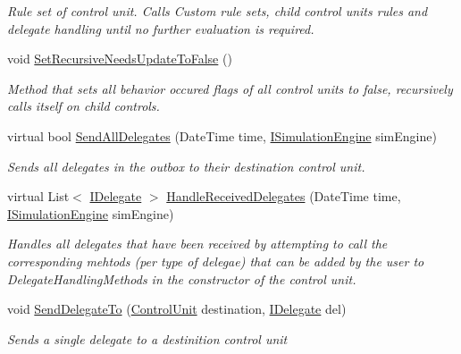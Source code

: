 \begin{DoxyCompactItemize}
\begin{DoxyCompactList}\small\item\em Rule set of control unit. Calls Custom rule sets, child control units rules and delegate handling until no further evaluation is required. \end{DoxyCompactList}\item 
void \hyperlink{class_simulation_core_1_1_h_c_c_m_elements_1_1_control_unit_a9269bc0295d7726e44ccd0d308cac776}{Set\+Recursive\+Needs\+Update\+To\+False} ()
\begin{DoxyCompactList}\small\item\em Method that sets all behavior occured flags of all control units to false, recursively calls itself on child controls. \end{DoxyCompactList}\item 
virtual bool \hyperlink{class_simulation_core_1_1_h_c_c_m_elements_1_1_control_unit_a6209d32c9661de07aab1848083533687}{Send\+All\+Delegates} (Date\+Time time, \hyperlink{interface_simulation_core_1_1_simulation_classes_1_1_i_simulation_engine}{I\+Simulation\+Engine} sim\+Engine)
\begin{DoxyCompactList}\small\item\em Sends all delegates in the outbox to their destination control unit. \end{DoxyCompactList}\item 
virtual List$<$ \hyperlink{interface_simulation_core_1_1_h_c_c_m_elements_1_1_i_delegate}{I\+Delegate} $>$ \hyperlink{class_simulation_core_1_1_h_c_c_m_elements_1_1_control_unit_a4f85fe01ec7bc2c8c435b702758ec240}{Handle\+Received\+Delegates} (Date\+Time time, \hyperlink{interface_simulation_core_1_1_simulation_classes_1_1_i_simulation_engine}{I\+Simulation\+Engine} sim\+Engine)
\begin{DoxyCompactList}\small\item\em Handles all delegates that have been received by attempting to call the corresponding mehtods (per type of delegae) that can be added by the user to Delegate\+Handling\+Methods in the constructor of the control unit. \end{DoxyCompactList}\item 
void \hyperlink{class_simulation_core_1_1_h_c_c_m_elements_1_1_control_unit_acdf548f1823c811b9347c7b5ec2885a6}{Send\+Delegate\+To} (\hyperlink{class_simulation_core_1_1_h_c_c_m_elements_1_1_control_unit}{Control\+Unit} destination, \hyperlink{interface_simulation_core_1_1_h_c_c_m_elements_1_1_i_delegate}{I\+Delegate} del)
\begin{DoxyCompactList}\small\item\em Sends a single delegate to a destinition control unit \end{DoxyCompactList}\item 

\end{DoxyCompactItemize}
